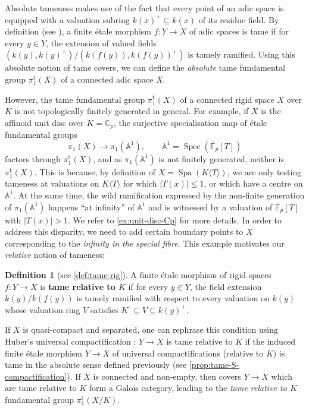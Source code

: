 \documentclass[a4paper,twoside,11pt,reqno]{amsart}
\renewcommand{\mathbb}{\mathds}
\newcommand{\bA}{{\mathbb A}}
\newcommand{\bC}{{\mathbb C}}
\newcommand{\la}{\longrightarrow}
\DeclareMathOperator{\Spec}{Spec}
\DeclareMathOperator{\Spa}{Spa}
\newcommand{\ov}[1]{\overline{#1}}
\newcommand{\pitame}{\pi_1^{\mathrm{t}}}
\theoremstyle{definition}
\newtheorem{defiABC}[thmABC]{Definition} %
\numberwithin{equation}{subsection}
\begin{document}
Absolute tameness makes use of the fact that every point of an adic space is equipped with a valuation subring $k(x)^+\subseteq k(x)$ of its residue field. 
By definition (see \cite[Definition~3.3]{Hubner2021:AdicTameSite}), a finite \'etale morphism $f\colon Y\to X$ of adic spaces is tame if for every $y\in Y$, the extension of valued fields $(k(y), k(y)^+)/(k(f(y)), k(f(y))^+)$ is tamely ramified. Using this absolute notion of tame covers, we can define the \emph{absolute} tame fundamental group $\pitame(X)$ of a connected adic space $X$. 

However, the tame fundamental group $\pitame(X)$ of a connected rigid space $X$ over $K$ is not topologically finitely generated in general. For example, if $X$ is the affinoid unit disc over $K = \bC_p$, the surjective specialisation map of étale fundamental groups
\[ 
    \pi_1(X) \la \pi_1(\bA^1), \qquad \bA^1 = \Spec(\overline{\mathbb{F}}_p[T])
\]
factors through $\pitame(X)$, and as $\pi_1(\bA^1)$ is not finitely generated, neither is $\pitame(X)$. This is because, by definition of $X = \Spa(K\langle T\rangle)$, we are only testing tameness at valuations on $K\langle T\rangle$ for which $|T(x)|\leq 1$, or which have a centre on $\bA^1$. At the same time, the wild ramification expressed by the non-finite generation of $\pi_1(\bA^1)$ happens ``at infinity'' of $\bA^1$ and is witnessed by a valuation of $\overline{\mathbb{F}}_p[T]$ with $|T(x)|>1$. We refer to \cref{ex:unit-disc-Cp} for more details. In order to address this disparity, we need to add certain boundary points to $X$ corresponding to the \emph{infinity in the special fibre}. This example motivates our \emph{relative} notion of tameness:

\begin{defiABC}[{see \cref{def:tame-rig}}]
    A finite \'etale morphism of rigid spaces $f\colon Y\to X$ is {\bf tame relative to $K$} if for every $y\in Y$, the field extension $k(y)/k(f(y))$ is tamely ramified with respect to every valuation on $k(y)$ whose valuation ring $V$ satisfies $K^\circ\subseteq V\subseteq k(y)^+$.
\end{defiABC}

If $X$ is quasi-compact and separated, one can rephrase this condition using Huber's universal compactification \cite[\S 5.1]{HuberBook}: $Y\to X$ is tame relative to $K$ if the induced finite \'etale morphism $\ov{Y}\to\ov{X}$ of universal compactifications (relative to $K$)  is tame in the absolute sense defined previously (see \cref{prop:tame-S-compactification}). If $X$ is connected and non-empty, then covers $Y\to X$ which are tame relative to $K$ form a Galois category, leading to the \textit{tame relative to $K$} fundamental group $\pitame(X/K)$. 
\end{document}
